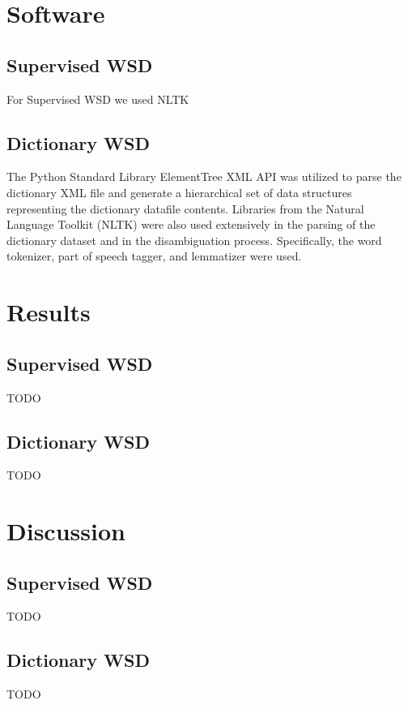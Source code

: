 \documentclass[11pt]{article}
\begin{document}
\section{Software}
\subsection{Supervised WSD}
For Supervised WSD we used NLTK 

\subsection{Dictionary WSD}
The Python Standard Library ElementTree XML API was utilized to parse the dictionary XML file and generate a hierarchical set of data structures representing the dictionary datafile contents. Libraries from the Natural Language Toolkit (NLTK) were also used extensively in the parsing of the dictionary dataset and in the disambiguation process. Specifically, the word tokenizer, part of speech tagger, and lemmatizer were used.

\section{Results}
\subsection{Supervised WSD}
TODO

\subsection{Dictionary WSD}
TODO

\section{Discussion}
\subsection{Supervised WSD}
TODO

\subsection{Dictionary WSD}
TODO
\end{document}
